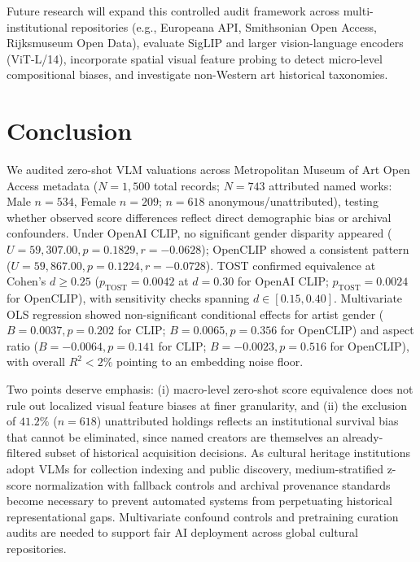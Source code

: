 \documentclass[pdflatex,sn-mathphys-num]{sn-jnl}%
\theoremstyle{thmstyleone}%
\theoremstyle{thmstyletwo}%
\theoremstyle{thmstylethree}%
\begin{document}
Future research will expand this controlled audit framework across multi-institutional repositories (e.g., Europeana API, Smithsonian Open Access, Rijksmuseum Open Data), evaluate SigLIP and larger vision-language encoders (ViT-L/14), incorporate spatial visual feature probing to detect micro-level compositional biases, and investigate non-Western art historical taxonomies.


\section{Conclusion}
\label{sec:conclusion}

We audited zero-shot VLM valuations across Metropolitan Museum of Art Open Access metadata ($N=1,500$ total records; $N=743$ attributed named works: Male $n=534$, Female $n=209$; $n=618$ anonymous/unattributed), testing whether observed score differences reflect direct demographic bias or archival confounders. Under OpenAI CLIP, no significant gender disparity appeared ($U = 59,307.00, p = 0.1829, r = -0.0628$); OpenCLIP showed a consistent pattern ($U = 59,867.00, p = 0.1224, r = -0.0728$). TOST confirmed equivalence at Cohen's $d \ge 0.25$ ($p_{\text{TOST}} = 0.0042$ at $d=0.30$ for OpenAI CLIP; $p_{\text{TOST}} = 0.0024$ for OpenCLIP), with sensitivity checks spanning $d \in [0.15, 0.40]$. Multivariate OLS regression showed non-significant conditional effects for artist gender ($B = 0.0037, p = 0.202$ for CLIP; $B = 0.0065, p = 0.356$ for OpenCLIP) and aspect ratio ($B = -0.0064, p = 0.141$ for CLIP; $B = -0.0023, p = 0.516$ for OpenCLIP), with overall $R^2 < 2\%$ pointing to an embedding noise floor.

Two points deserve emphasis: (i) macro-level zero-shot score equivalence does not rule out localized visual feature biases at finer granularity, and (ii) the exclusion of $41.2\%$ ($n=618$) unattributed holdings reflects an institutional survival bias that cannot be eliminated, since named creators are themselves an already-filtered subset of historical acquisition decisions. As cultural heritage institutions adopt VLMs for collection indexing and public discovery, medium-stratified z-score normalization with fallback controls and archival provenance standards become necessary to prevent automated systems from perpetuating historical representational gaps. Multivariate confound controls and pretraining curation audits are needed to support fair AI deployment across global cultural repositories.
\end{document}

